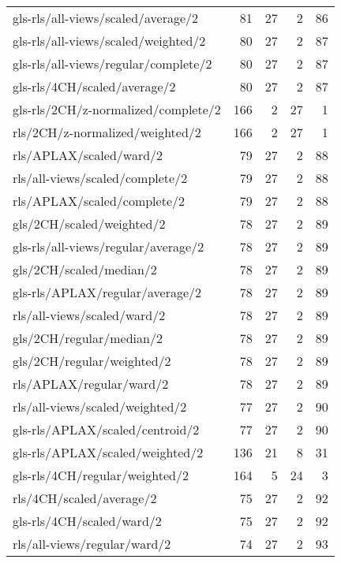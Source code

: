 \begin{longtable}{lrrrr}
    gls-rls/all-views/scaled/average/2        &  81 & 27 &  2 & 86 \\
    gls-rls/all-views/scaled/weighted/2       &  80 & 27 &  2 & 87 \\
    gls-rls/all-views/regular/complete/2      &  80 & 27 &  2 & 87 \\
    gls-rls/4CH/scaled/average/2              &  80 & 27 &  2 & 87 \\
    gls-rls/2CH/z-normalized/complete/2       & 166 &  2 & 27 &  1 \\
    rls/2CH/z-normalized/weighted/2           & 166 &  2 & 27 &  1 \\
    rls/APLAX/scaled/ward/2                   &  79 & 27 &  2 & 88 \\
    rls/all-views/scaled/complete/2           &  79 & 27 &  2 & 88 \\
    rls/APLAX/scaled/complete/2               &  79 & 27 &  2 & 88 \\
    gls/2CH/scaled/weighted/2                 &  78 & 27 &  2 & 89 \\
    gls-rls/all-views/regular/average/2       &  78 & 27 &  2 & 89 \\
    gls/2CH/scaled/median/2                   &  78 & 27 &  2 & 89 \\
    gls-rls/APLAX/regular/average/2           &  78 & 27 &  2 & 89 \\
    rls/all-views/scaled/ward/2               &  78 & 27 &  2 & 89 \\
    gls/2CH/regular/median/2                  &  78 & 27 &  2 & 89 \\
    gls/2CH/regular/weighted/2                &  78 & 27 &  2 & 89 \\
    rls/APLAX/regular/ward/2                  &  78 & 27 &  2 & 89 \\
    rls/all-views/scaled/weighted/2           &  77 & 27 &  2 & 90 \\
    gls-rls/APLAX/scaled/centroid/2           &  77 & 27 &  2 & 90 \\
    gls-rls/APLAX/scaled/weighted/2           & 136 & 21 &  8 & 31 \\
    gls-rls/4CH/regular/weighted/2            & 164 &  5 & 24 &  3 \\
    rls/4CH/scaled/average/2                  &  75 & 27 &  2 & 92 \\
    gls-rls/4CH/scaled/ward/2                 &  75 & 27 &  2 & 92 \\
    rls/all-views/regular/ward/2              &  74 & 27 &  2 & 93 \\

\end{longtable}
